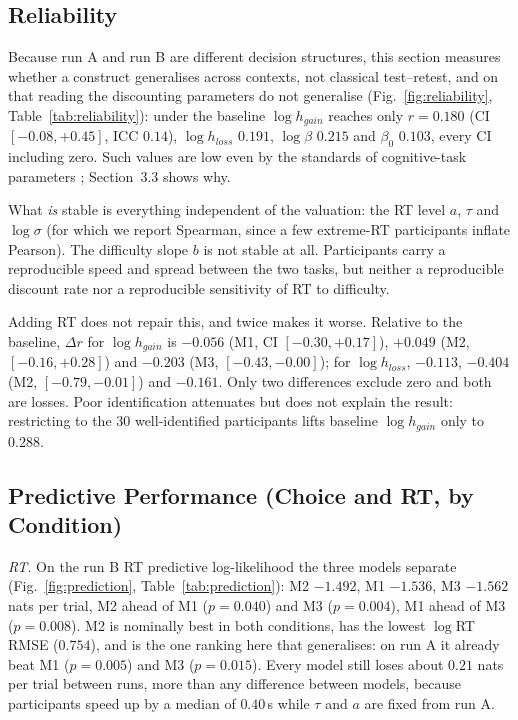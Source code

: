 \documentclass[11pt,a4paper]{article}
\begin{document}
\subsection{Reliability}

Because run A and run B are different decision structures, this section measures whether a
construct generalises across contexts, not classical test--retest, and on that reading the
discounting parameters do not generalise (Fig.~\ref{fig:reliability},
Table~\ref{tab:reliability}): under the baseline $\log h_{gain}$ reaches only $r=0.180$ (CI
$[-0.08,+0.45]$, ICC $0.14$), $\log h_{loss}$ $0.191$, $\log\beta$ $0.215$ and $\beta_0$
$0.103$, every CI including zero. Such values are low even by the standards of cognitive-task
parameters \citep{hedge2018,enkavi2019}; Section~3.3 shows why.

What \emph{is} stable is everything independent of the valuation: the RT level $a$, $\tau$
and $\log\sigma$ (for which we report Spearman, since a few extreme-RT participants inflate
Pearson). The difficulty slope $b$ is not stable at all. Participants carry a
reproducible speed and spread between the two tasks, but neither a reproducible discount rate
nor a reproducible sensitivity of RT to difficulty.

Adding RT does not repair this, and twice makes it worse. Relative to the baseline, $\Delta r$
for $\log h_{gain}$ is $-0.056$ (M1, CI $[-0.30,+0.17]$), $+0.049$ (M2, $[-0.16,+0.28]$) and
$-0.203$ (M3, $[-0.43,-0.00]$); for $\log h_{loss}$, $-0.113$, $-0.404$ (M2, $[-0.79,-0.01]$)
and $-0.161$. Only two differences exclude zero and both are losses. Poor identification
attenuates but does not explain the result: restricting to the 30 well-identified participants
lifts baseline $\log h_{gain}$ only to $0.288$.

\subsection{Predictive Performance (Choice and RT, by Condition)}

\emph{RT.} On the run B RT predictive log-likelihood the three models separate
(Fig.~\ref{fig:prediction}, Table~\ref{tab:prediction}): M2 $-1.492$, M1 $-1.536$, M3 $-1.562$
nats per trial, M2 ahead of M1 ($p=0.040$) and M3 ($p=0.004$), M1 ahead of M3 ($p=0.008$). M2 is
nominally best in both conditions, has the lowest $\log$RT RMSE ($0.754$), and is the one
ranking here that generalises: on run A it already beat M1 ($p=0.005$) and M3 ($p=0.015$). Every
model still loses about $0.21$ nats per trial between runs, more than any difference between
models, because participants speed up by a median of $0.40$\,s while $\tau$ and $a$ are fixed
from run A.
\end{document}
